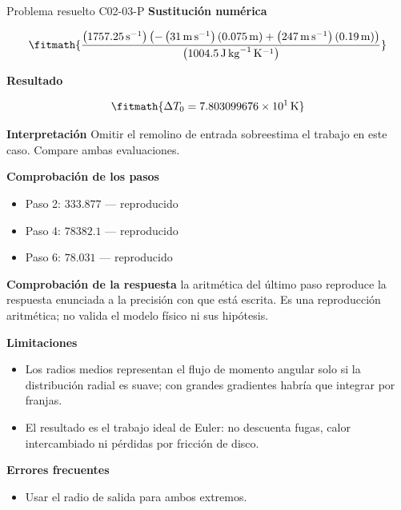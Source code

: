 \documentclass[10pt,openany]{book}
\begin{document}
\begin{studiumworked}{Problema resuelto C02-03-P}
\noindent\textbf{Sustitución numérica}

\[
\fitmath{\frac{\left(1757.25\,\mathrm{s}^{-1}\right) \left(- \left(31\,\mathrm{m}\,\mathrm{s}^{-1}\right) \left(0.075\,\mathrm{m}\right) + \left(247\,\mathrm{m}\,\mathrm{s}^{-1}\right) \left(0.19\,\mathrm{m}\right)\right)}{\left(1004.5\,\mathrm{J}\,\mathrm{kg}^{-1}\,\mathrm{K}^{-1}\right)}}
\]

\noindent\textbf{Resultado}

\[
\fitmath{\Delta T_0=7.803099676\times10^{1}\,\mathrm{K}}
\]

\noindent\textbf{Interpretación}
Omitir el remolino de entrada sobreestima el trabajo en este caso. Compare ambas evaluaciones.

\noindent\textbf{Comprobación de los pasos}
\begin{itemize}
\item Paso 2: $333.877$ — reproducido
\item Paso 4: $78382.1$ — reproducido
\item Paso 6: $78.031$ — reproducido
\end{itemize}

\noindent\textbf{Comprobación de la respuesta} la aritmética del último paso reproduce la respuesta enunciada a la precisión con que está escrita. Es una reproducción aritmética; no valida el modelo físico ni sus hipótesis.

\noindent\textbf{Limitaciones}
\begin{itemize}
\item Los radios medios representan el flujo de momento angular solo si la distribución radial es suave; con grandes gradientes habría que integrar por franjas.
\item El resultado es el trabajo ideal de Euler: no descuenta fugas, calor intercambiado ni pérdidas por fricción de disco.
\end{itemize}

\noindent\textbf{Errores frecuentes}
\begin{itemize}
\item Usar el radio de salida para ambos extremos.
\end{itemize}
\end{studiumworked}
\end{document}
